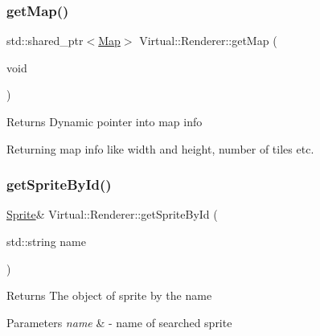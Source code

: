 \subsubsection{\texorpdfstring{get\+Map()}{getMap()}}
{\footnotesize\ttfamily std\+::shared\+\_\+ptr$<$\hyperlink{struct_virtual_1_1_map}{Map}$>$ Virtual\+::\+Renderer\+::get\+Map (\begin{DoxyParamCaption}\item[{void}]{ }\end{DoxyParamCaption})}

\begin{DoxyReturn}{Returns}
Dynamic pointer into map info
\end{DoxyReturn}
Returning map info like width and height, number of tiles etc. \hypertarget{class_virtual_1_1_renderer_ae2be5bddf056acb2c00f77fb6f0afa6c}{}\label{class_virtual_1_1_renderer_ae2be5bddf056acb2c00f77fb6f0afa6c} 
\subsubsection{\texorpdfstring{get\+Sprite\+By\+Id()}{getSpriteById()}}
{\footnotesize\ttfamily \hyperlink{class_virtual_1_1_sprite}{Sprite}\& Virtual\+::\+Renderer\+::get\+Sprite\+By\+Id (\begin{DoxyParamCaption}\item[{std\+::string}]{name }\end{DoxyParamCaption})}

\begin{DoxyReturn}{Returns}
The object of sprite by the name
\end{DoxyReturn}

\begin{DoxyParams}{Parameters}
{\em name} & -\/ name of searched sprite \\
\hline
\end{DoxyParams}
\hypertarget{class_virtual_1_1_renderer_a6addf8a58c9024701a5da4fe814561e8}{}\label{class_virtual_1_1_renderer_a6addf8a58c9024701a5da4fe814561e8} 
